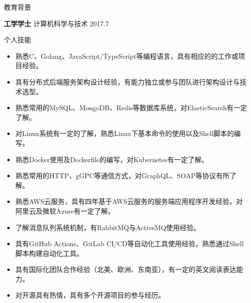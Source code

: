 \documentclass{resume} %
\begin{document}

\begin{rSection}{教育背景}

  {\bf 工学学士} 计算机科学与技术 \hfill {2017.7}

\end{rSection}

\begin{rSection}{个人技能}
  \begin{itemize}
    \itemsep -3pt {}
    \item 熟悉C、Golang、JavaScript/TypeScript等编程语言，具有相应的的工作或项目经验。
    \item 具有分布式后端服务架构设计经验，有能力独立或参与团队进行架构设计与技术选型。
    \item 熟悉常用的MySQL、MongoDB、Redis等数据库系统，对ElasticSearch有一定了解。
    \item 对Linux系统有一定的了解，熟悉Linux下基本命令的使用以及Shell脚本的编写。
    \item 熟悉Docker使用及Dockerfile的编写，对Kubernetes有一定了解。
    \item 熟悉常用的HTTP、gGPC等通信方式，对GraphQL、SOAP等协议有所了解。
    \item 熟悉AWS云服务，具有四年基于AWS云服务的服务端应用程序开发经验，对阿里云及微软Azure有一定了解。
    \item 了解消息队列系统机制，有RabbitMQ与ActiveMQ使用经验。
    \item 具有GitHub Actions、GitLab CI/CD等自动化工具使用经验，熟悉通过Shell脚本构建自动化工具。
    \item 具有国际化团队合作经验（北美、欧洲、东南亚），有一定的英文阅读表达能力。
    \item 对开源具有热情，具有多个开源项目的参与经历。
  \end{itemize}
\end{rSection}
\end{document}
